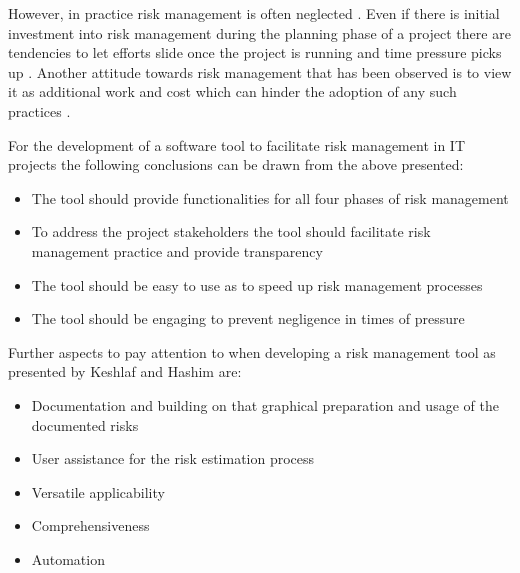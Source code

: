 However, in practice risk management is often neglected \cite{kwakProjectRiskManagement2004}. Even if there is initial investment into risk management during the planning phase of a project there are tendencies to let efforts slide once the project is running and time pressure picks up \cite{peixotoProjectRiskManagement2014}. Another attitude towards risk management that has been observed is to view it as additional work and cost which can hinder the adoption of any such practices \cite{teschITProjectRisk2007}.

For the development of a software tool to facilitate risk management in IT projects the following conclusions can be drawn from the above presented:
\begin{itemize}
	\item The tool should provide functionalities for all four phases of risk management
	\item To address the project stakeholders the tool should facilitate risk management practice and provide transparency
	\item The tool should be easy to use as to speed up risk management processes
	\item The tool should be engaging to prevent negligence in times of pressure	
\end{itemize}
Further aspects to pay attention to when developing a risk management tool as presented by Keshlaf and Hashim \cite{keshlafModelPrototypeTool2000} are:
\begin{itemize}
	\item	Documentation and building on that graphical preparation and usage of the documented risks
	\item	User assistance for the risk estimation process
	\item	Versatile applicability
	\item	Comprehensiveness
	\item	Automation	
\end{itemize}